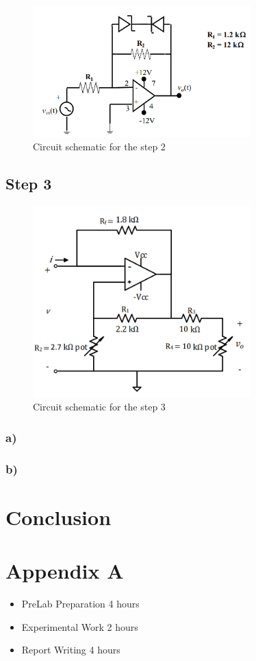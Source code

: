 \documentclass[letterpaper,12pt]{article}
\begin{document}
\begin{figure}[H]
    \centering
    \includegraphics[width = 0.75\textwidth]{2SCH.png}
    \caption{Circuit schematic for the step 2}
\end{figure} 

\subsection{Step 3}


\begin{figure}[H]
    \centering
    \includegraphics[width = 0.75\textwidth]{3SCH.png}
    \caption{Circuit schematic for the step 3}
\end{figure} 

\subsubsection{a)}

\subsubsection{b)}

\section{Conclusion}



\section*{Appendix A}
\begin{itemize}
    \item PreLab Preparation 4 hours
    \item Experimental Work 2  hours
    \item Report Writing 4 hours
\end{itemize}
\end{document}
